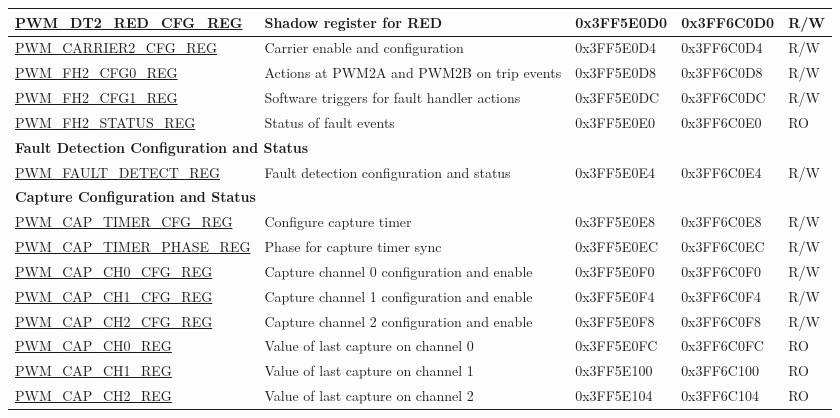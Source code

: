 \begin{longtable}{ | p{5.5cm} | p{5.7cm} | p{2cm} | p{2cm} | p{0.8cm} | }
\hyperref[regdesc:PWMDT2REDCFGREG]{PWM\_DT2\_RED\_CFG\_REG} & Shadow register for RED & 0x3FF5E0D0 & 0x3FF6C0D0 & R/W \\ \hline
\hyperref[regdesc:PWMCARRIER2CFGREG]{PWM\_CARRIER2\_CFG\_REG} & Carrier enable and configuration & 0x3FF5E0D4 & 0x3FF6C0D4 & R/W \\ \hline
\hyperref[regdesc:PWMFH2CFG0REG]{PWM\_FH2\_CFG0\_REG} & Actions at PWM2A and PWM2B on trip events & 0x3FF5E0D8 & 0x3FF6C0D8 & R/W \\ \hline
\hyperref[regdesc:PWMFH2CFG1REG]{PWM\_FH2\_CFG1\_REG} & Software triggers for fault handler actions & 0x3FF5E0DC & 0x3FF6C0DC & R/W \\ \hline
\hyperref[regdesc:PWMFH2STATUSREG]{PWM\_FH2\_STATUS\_REG} & Status of fault events & 0x3FF5E0E0 & 0x3FF6C0E0 & RO \\ \hline
\multicolumn{5}{|l|}{\textbf{Fault Detection Configuration and Status}} \\ \hline
\hyperref[regdesc:PWMFAULTDETECTREG]{PWM\_FAULT\_DETECT\_REG} & Fault detection configuration and status & 0x3FF5E0E4 & 0x3FF6C0E4 & R/W \\ \hline
\multicolumn{5}{|l|}{\textbf{Capture Configuration and Status}} \\ \hline
\hyperref[regdesc:PWMCAPTIMERCFGREG]{PWM\_CAP\_TIMER\_CFG\_REG} & Configure capture timer & 0x3FF5E0E8 & 0x3FF6C0E8 & R/W \\ \hline
\hyperref[regdesc:PWMCAPTIMERPHASEREG]{PWM\_CAP\_TIMER\_PHASE\_REG} & Phase for capture timer sync & 0x3FF5E0EC & 0x3FF6C0EC & R/W \\ \hline
\hyperref[regdesc:PWMCAPCH0CFGREG]{PWM\_CAP\_CH0\_CFG\_REG} & Capture channel 0 configuration and enable & 0x3FF5E0F0 & 0x3FF6C0F0 & R/W \\ \hline
\hyperref[regdesc:PWMCAPCH1CFGREG]{PWM\_CAP\_CH1\_CFG\_REG} & Capture channel 1 configuration and enable & 0x3FF5E0F4 & 0x3FF6C0F4 & R/W \\ \hline
\hyperref[regdesc:PWMCAPCH2CFGREG]{PWM\_CAP\_CH2\_CFG\_REG} & Capture channel 2 configuration and enable & 0x3FF5E0F8 & 0x3FF6C0F8 & R/W \\ \hline
\hyperref[regdesc:PWMCAPCH0REG]{PWM\_CAP\_CH0\_REG} & Value of last capture on channel 0 & 0x3FF5E0FC & 0x3FF6C0FC & RO \\ \hline
\hyperref[regdesc:PWMCAPCH1REG]{PWM\_CAP\_CH1\_REG} & Value of last capture on channel 1 & 0x3FF5E100 & 0x3FF6C100 & RO \\ \hline
\hyperref[regdesc:PWMCAPCH2REG]{PWM\_CAP\_CH2\_REG} & Value of last capture on channel 2 & 0x3FF5E104 & 0x3FF6C104 & RO \\ \hline

\end{longtable}
